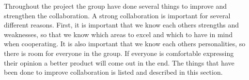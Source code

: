 
Throughout the project the group have done several things to improve and strengthen the collaboration. A strong collaboration is important for several different reasons. First, it is important that we know each others strengths and weaknesses, so that we know which areas to excel and which to have in mind when cooperating. It is also important that we know each others personalities, so there is room for everyone in the group. If everyone is comfortable expressing their opinion a better product will come out in the end. The things that have been done to improve collaboration is listed and described in this section. 